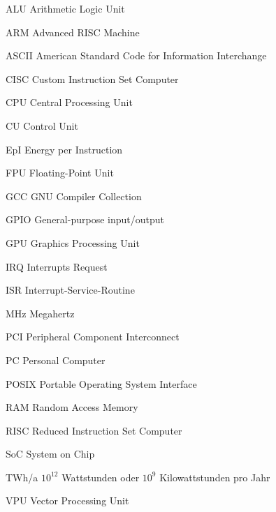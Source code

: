 \begin{abkuerzungen}[MUSTER] %
\item[ALU] Arithmetic Logic Unit
\item[ARM] Advanced RISC Machine
\item[ASCII] American Standard Code for Information Interchange
\item[CISC] Custom Instruction Set Computer
\item[CPU] Central Processing Unit
\item[CU] Control Unit
\item[EpI] Energy per Instruction
\item[FPU] Floating-Point Unit
\item[GCC] GNU Compiler Collection
\item[GPIO] General-purpose input/output
\item[GPU] Graphics Processing Unit
\item[IRQ] Interrupts Request
\item[ISR] Interrupt-Service-Routine
\item[MHz] Megahertz
\item[PCI] Peripheral Component Interconnect
\item[PC] Personal Computer
\item[POSIX] Portable Operating System Interface
\item[RAM] Random Access Memory
\item[RISC] Reduced Instruction Set Computer
\item[SoC] System on Chip
\item[TWh/a] $10^{12}$ Wattstunden oder $10^{9}$ Kilowattstunden pro Jahr
\item[VPU] Vector Processing Unit
\end{abkuerzungen}
